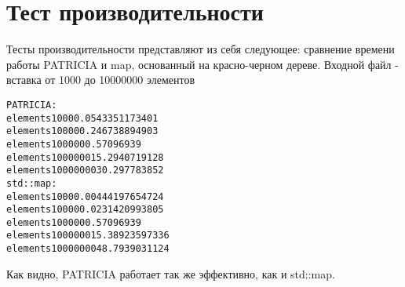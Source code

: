 \section{Тест производительности}
Тесты производительности представляют из себя следующее: сравнение времени работы PATRICIA и map, основанный на красно-черном дереве. Входной файл - вставка от 1000 до 10000000 элементов

\begin{alltt}
	PATRICIA:
	elements 1000 0.0543351173401
	elements 10000 0.246738894903
	elements 100000 0.57096939
	elements 1000000 15.2940719128
	elements 10000000 30.297783852
	std::map:
	elements 1000 0.00444197654724
	elements 10000 0.0231420993805
	elements 100000 0.57096939
	elements 1000000 15.38923597336
	elements 10000000 48.7939031124
\end{alltt}

Как видно, PATRICIA работает так же эффективно, как и std::map.

\pagebreak